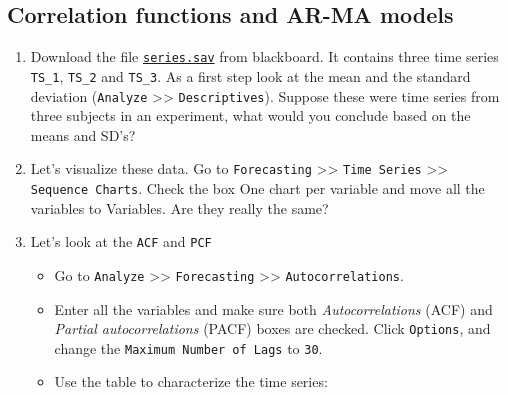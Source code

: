 \documentclass[]{book}
\providecommand{\tightlist}{%
  \setlength{\itemsep}{0pt}\setlength{\parskip}{0pt}}
\begin{document}
\subsection{Correlation functions and AR-MA
models}\label{correlation-functions-and-ar-ma-models}

\begin{enumerate}
\def\labelenumi{\arabic{enumi}.}
\item
  Download the file
  \href{https://github.com/FredHasselman/DCS/blob/master/assignmentData/BasicTSA_arma/series.sav}{\texttt{series.sav}}
  from blackboard. It contains three time series \texttt{TS\_1},
  \texttt{TS\_2} and \texttt{TS\_3}. As a first step look at the mean
  and the standard deviation (\texttt{Analyze}
  \textgreater{}\textgreater{} \texttt{Descriptives}). Suppose these
  were time series from three subjects in an experiment, what would you
  conclude based on the means and SD's?
\item
  Let's visualize these data. Go to \texttt{Forecasting}
  \textgreater{}\textgreater{} \texttt{Time\ Series}
  \textgreater{}\textgreater{} \texttt{Sequence\ Charts}. Check the box
  One chart per variable and move all the variables to Variables. Are
  they really the same?
\item
  Let's look at the \texttt{ACF} and \texttt{PCF}

  \begin{itemize}
  \tightlist
  \item
    Go to \texttt{Analyze} \textgreater{}\textgreater{}
    \texttt{Forecasting} \textgreater{}\textgreater{}
    \texttt{Autocorrelations}.
  \item
    Enter all the variables and make sure both \emph{Autocorrelations}
    (ACF) and \emph{Partial autocorrelations} (PACF) boxes are checked.
    Click \texttt{Options}, and change the
    \texttt{Maximum\ Number\ of\ Lags} to \texttt{30}.
  \item
    Use the table to characterize the time series:
  \end{itemize}
\end{enumerate}
\end{document}
